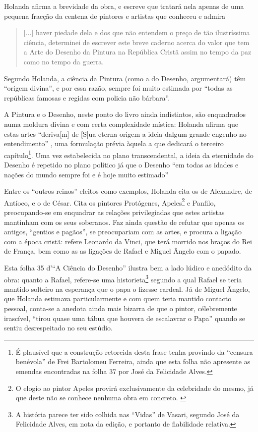 \documentclass{article}
\begin{document}
Holanda afirma a brevidade da obra, e escreve que tratará nela apenas
de uma pequena fracção da centena de pintores e artistas que conheceu
e admira \cite[fl.34r]{holanda}

\begin{quote}
  [...] haver piedade dela e dos que não entendem o preço de tão
  ilustríssima ciência, determinei de escrever este breve caderno
  acerca do valor que tem a Arte do Desenho da Pintura na República
  Cristã assim no tempo da paz como no tempo da guerra.
\end{quote}

Segundo Holanda, a ciência da Pintura (como a do Desenho, argumentará)
têm ``origem divina'', e por essa razão, sempre foi muito
estimada por ``todas as repúblicas famosas e regidas com policia não
bárbara''\cite[fl.33r]{holanda}.

A Pintura e o Desenho, neste ponto do livro ainda indistintos, são
enquadrados numa moldura divina e com certa complexidade mística:
Holanda afirma que estas artes ``deriva[m] de [S]ua eterna origem a
ideia dalgum grande engenho no entendimento'' \cite[fl.34r]{holanda},
uma formulação prévia àquela a que dedicará o terceiro
capítulo\footnote{É plausível que a construção retorcida desta frase
  tenha provindo da ``censura benévola'' de Frei Bartolomeu Ferreira,
  ainda que esta folha não apresente as emendas encontradas na folha
  37 por José da Felicidade Alves.}. Uma vez estabelecida no plano
transcendental, a ideia da eternidade do Desenho é repetido no plano
político já que o Desenho ``em todas as idades e nações do mundo
sempre foi e é hoje muito estimado'' \cite[fl.34r]{holanda}

Entre os ``outros reinos'' eleitos como exemplos, Holanda cita os de
Alexandre, de Antíoco, e o de César. Cita os pintores Protógenes,
Apeles\footnote{O elogio ao pintor Apeles provirá exclusivamente da
  celebridade do mesmo, já que deste não se conhece nenhuma obra em
  concreto. \cite{calado}} e Panfilo, preocupando-se em enquadrar as
relações privilegiadas que estes artistas mantinham com os seus
soberanos. Faz ainda questão de refutar que apenas os antigos,
``gentios e pagãos'', se preocupariam com as artes, e procura a
ligação com a época cristã: refere Leonardo da Vinci, que terá morrido
nos braços do Rei de França, bem como as as ligações de Rafael e
Miguel Ângelo com o papado.

Esta folha 35 d'``A Ciência do Desenho'' ilustra bem a lado lúdico e
anedódito da obra: quanto a Rafael, refere-se uma
historieta\footnote{A história parece ter sido colhida nas ``Vidas''
  de Vasari, segundo José da Felicidade Alves, em nota da edição, e
  portanto de fiabilidade relativa.} segundo a qual Rafael se teria
mantido solteiro na esperança que o papa o fizesse cardeal. Já de
Miguel Ângelo, que Holanda estimava particularmente e com quem teria
mantido contacto pessoal, conta-se a anedota ainda mais bizarra de que
o pintor, célebremente irascível, ``tirou quase uma tábua que houvera
de escalavrar o Papa'' quando se sentiu desrespeitado no seu estúdio.
\end{document}
